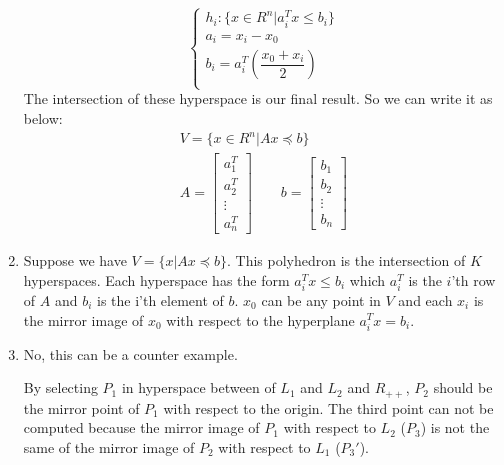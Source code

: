 \documentclass[a4paper]{article}
\begin{document}
\begin{latin}
\begin{enumerate}
	\begin{equation*}
		\begin{cases}
		h_{i}: \{x \in R^{n} | a_{i}^{T} x \leq b_{i}\} \\
		a_{i} = x_{i} - x_{0} \\
		b_{i} = a_{i}^{T}(\dfrac{x_{0} + x_{i}}{2})\\
		\end{cases}
	\end{equation*}
	The intersection of these hyperspace is our final result. So we can write it as below:
	\begin{gather*}
		V = \{ x \in R^{n} | Ax\preceq b\}
		\\
		A = \begin{bmatrix}
			a_{1}^{T}\\
			a_{2}^{T}\\
			\vdots \\
			a_{n}^{T}
		\end{bmatrix}
		\qquad
		b = \begin{bmatrix}
			b_{1}\\
			b_{2}\\
			\vdots \\
			b_{n}	
		\end{bmatrix}	
	\end{gather*}
	\item
	Suppose we have $ V = \{x | Ax \preceq b\} $. This polyhedron is the intersection of $ K $ hyperspaces. Each hyperspace has the form $ a_{i}^{T} x \leq b_{i} $ which $ a_{i}^{T} $ is the $ i $'th row of $ A $ and $ b_{i} $ is the i'th element of $ b $. $ x_{0} $ can be any point in $ V $ and each $ x_{i} $ is the mirror image of $ x_{0} $ with respect to the hyperplane $ a_{i}^{T} x = b_{i} $.
	\item 
	No, this can be a counter example.
	\begin{center}
	\end{center}
	By selecting $ P_{1} $ in hyperspace between of $L_1$ and $L_2$ and $ R_{++} $, $ P_{2} $ should be the mirror point of $ P_{1} $ with respect to the origin. The third point can not be computed because the mirror image of $ P_{1} $ with respect to $L_2$ ($ P_{3} $) is not the same of the mirror image of $ P_{2} $ with respect to $L_1$ ($ P_{3}' $).
\end{enumerate}

\end{latin}
\end{document}
